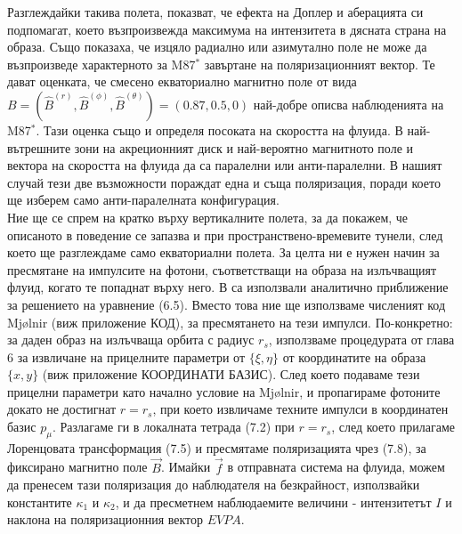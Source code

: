Разглеждайки такива полета, \cite{Narayan2021} показват, че ефекта на Доплер и аберацията си подпомагат, което възпроизвежда максимума на интензитета в дясната страна на образа. Също показаха, че изцяло радиално или азимутално поле не може да възпроизведе характерното за M87$^*$ завъртане на поляризационният вектор. Те дават оценката, че смесено екваториално магнитно поле от вида $B = (\hat{B}^{(r)},\hat{B}^{(\phi)},\hat{B}^{(\theta)}) = (0.87,0.5,0)$ най-добре описва наблюденията на M87$^*$. Тази оценка също и определя посоката на скоростта на флуида. В най-вътрешните зони на акреционният диск и най-вероятно магнитното поле и вектора на скоростта на флуида да са паралелни или анти-паралелни. В нашият случай тези две възможности пораждат една и съща поляризация, поради което ще изберем само анти-паралелната конфигурация.\\

Ние ще се спрем на кратко върху вертикалните полета, за да покажем, че описаното в \cite{Narayan2021} поведение се запазва и при пространствено-времевите тунели, след което ще разглеждаме само екваториални полета. За целта ни е нужен начин за пресмятане на импулсите на фотони, съответстващи на образа на излъчващият флуид, когато те попаднат върху него. В \cite{Narayan2021} са използвали аналитично приближение за решението на уравнение (6.5). Вместо това ние ще използваме численият код Mjølnir (виж приложение КОД), за пресмятането на тези импулси. По-конкретно: за даден образ на излъчваща орбита с радиус $r_s$, използваме процедурата от глава 6 за извличане на прицелните параметри от $\{\xi,\eta\}$ от координатите на образа $\{x, y\}$ (виж приложение КООРДИНАТИ БАЗИС). След което подаваме тези прицелни параметри като начално условие на Mjølnir, и пропагираме фотоните докато не достигнат $r = r_s$, при което извличаме техните импулси в координатен базис $p_\mu$. Разлагаме ги в локалната тетрада (7.2) при $r = r_s$, след което прилагаме Лоренцовата трансформация (7.5) и пресмятаме поляризацията чрез (7.8), за фиксирано магнитно поле $\vec{B}$. Имайки $\vec{f}$ в отправната система на флуида, можем да пренесем тази поляризация до наблюдателя на безкрайност, използвайки константите $\kappa_1$ и $\kappa_2$, и да пресметнем наблюдаемите величини - интензитетът $I$ и наклона на поляризационния вектор $EVPA$.
